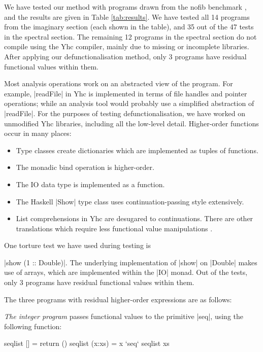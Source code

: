 \documentclass[preprint]{sigplanconf}
\begin{document}
We have tested our method with programs drawn from the nofib benchmark \cite{nofib}, and the results are given in Table \ref{tab:results}. We have tested all 14 programs from the imaginary section (each shown in the table), and 35 out of the 47 tests in the spectral section. The remaining 12 programs in the spectral section do not compile using the Yhc compiler, mainly due to missing or incomplete libraries. After applying our defunctionalisation method, only 3 programs have residual functional values within them.

Most analysis operations work on an abstracted view of the program. For example, |readFile| in Yhc is implemented in terms of file handles and pointer operations; while an analysis tool would probably use a simplified abstraction of |readFile|. For the purposes of testing defunctionalisation, we have worked on unmodified Yhc libraries, including all the low-level detail. Higher-order functions occur in many places:

\begin{itemize}
\item Type classes create dictionaries which are implemented as tuples of functions.
\item The monadic bind operation is higher-order.
\item The IO data type is implemented as a function.
\item The Haskell |Show| type class uses continuation-passing style extensively.
\item List comprehensions in Yhc are desugared to continuations. There are other translations which require less functional value manipulations \cite{wadler:list_comprehensions,coutts:stream_fusion}.
\end{itemize}

One torture test we have used during testing is \ignore|show (1 :: Double)|. The underlying implementation of |show| on |Double| makes use of arrays, which are implemented within the |IO| monad. Out of the tests, only 3 programs have residual functional values within them.

The three programs with residual higher-order expressions are as follows:

\textit{The integer program} passes functional values to the primitive |seq|, using the following function:

\begin{code}
seqlist [] = return ()
seqlist (x:xs) = x `seq` seqlist xs
\end{code}
\end{document}
